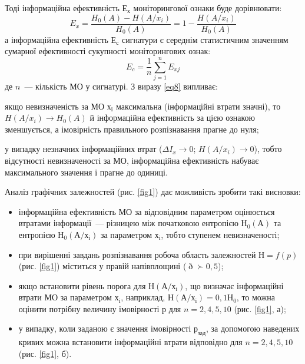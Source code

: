 Тоді інформаційна ефективність $Е_х$ моніторингової ознаки буде дорівнювати:
\begin{equation}\label{radap1354eq8}
E_x = \frac{H_0(A)-H(A/x_i)}{H_0(A)} = 1-\frac{H(A/x_i)}{H_0(A)}
\end{equation}
а інформаційна ефективність $Е_с$ сигнатури є середнім статистичним значенням сумарної ефективності сукупності моніторингових ознак:
\begin{equation}\label{radap1354eq9}
E_c = \frac{1}{n}\sum\limits_{j=1}^{n}E_{xj}
\end{equation}
де $n$~--- кількість МО у сигнатурі.
З виразу \eqref{eq8} випливає:
\begin{list}{-}{}
	\item якщо невизначеність за МО $х_і$ максимальна (інформаційні втрати значні), то $H(A/x_i) \to H_0(A)$  й інформаційна ефективність за цією ознакою зменшується, а імовірність правильного розпізнавання прагне до нуля;
	
	\item у випадку незначних інформаційних втрат ($\Delta I_x \to 0$; $H(A/x_i) \to 0$), тобто відсутності невизначеності за МО, інформаційна ефективність набуває максимального значення і прагне до одиниці.
\end{list}

Аналіз графічних залежностей (рис. \ref{fig1}) дає можливість зробити такі висновки:
\begin{itemize}
	\item інформаційна ефективність МО за відповідним параметром оцінюється втратами інформації~--- різницею між початковою ентропією $Н_0(А)$ та ентропією $Н_0(А/х_і)$ за параметром $х_і$, тобто ступенем невизначеності;
	
	\item при вирішенні завдань розпізнавання робоча область залежностей $Н = f(p)$ (рис. \ref{fig1}) міститься у правій напівплощині ($\eth \succ 0,5$);
	
	\item якщо встановити рівень порога для $Н(А/х_і)$, що визначає інформаційні втрати МО за параметром $х_і$, наприклад, $Н(А/х_і) = 0,1Н_0$, то можна оцінити потрібну величину імовірності $р$ для $n = 2, 4, 5, 10$ (рис. \ref{fig1}, а);
	
	\item у випадку, коли заданою є значення імовірності $р_{зад}$, за допомогою наведених кривих можна встановити інформаційні втрати відповідно для $n = 2, 4, 5, 10$ (рис. \ref{fig1}, б).
\end{itemize}

